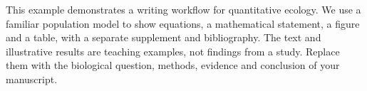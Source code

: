 This example demonstrates a writing workflow for quantitative ecology. We use a familiar population model to show equations, a mathematical statement, a figure and a table, with a separate supplement and bibliography. The text and illustrative results are teaching examples, not findings from a study. Replace them with the biological question, methods, evidence and conclusion of your manuscript.
